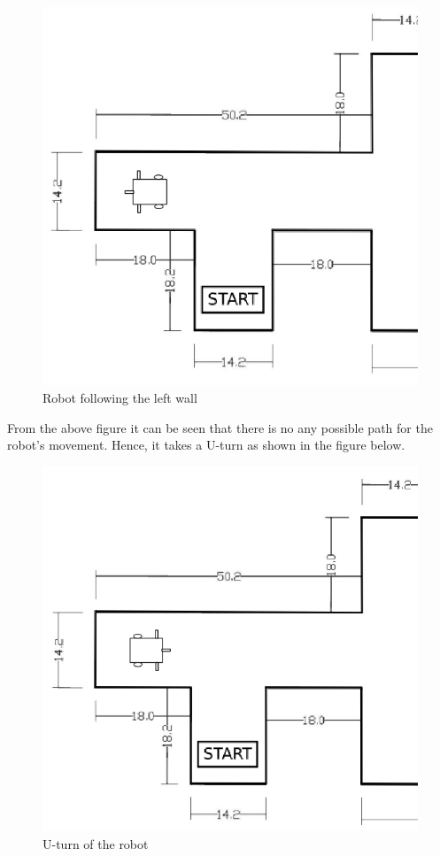 \begin{figure}[h]
\center
\includegraphics[scale=0.6]{part1_2new.jpg}
\caption{Robot following the left wall} 
\end{figure}
\justify From the above figure it can be seen that there is no any possible path for the robot's movement. Hence, it takes a U-turn as shown in the figure below.\\
\newpage
\begin{figure}[h]
\center
\includegraphics[scale=0.6]{part1_3new.jpg}
\caption{U-turn of the robot} 
\end{figure}

